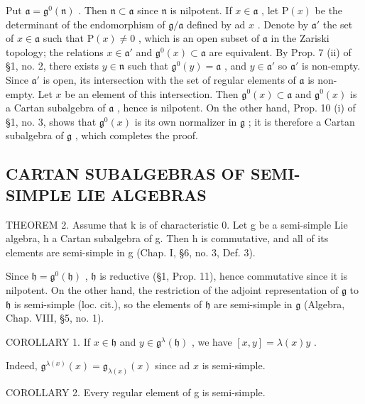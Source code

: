 Put \(\mathfrak{a} = \mathfrak{g}^0 (\mathfrak{n})\) . Then \(\mathfrak{n}\subset \mathfrak{a}\) since \(\mathfrak{n}\) is nilpotent. If \(x\in \mathfrak{a}\) , let \(\mathrm{P}(x)\) be the determinant of the endomorphism of \(\mathfrak{g} / \mathfrak{a}\) defined by ad \(x\) . Denote by \(\mathfrak{a}'\) the set of \(x\in \mathfrak{a}\) such that \(\mathrm{P}(x)\neq 0\) , which is an open subset of \(\mathfrak{a}\) in the Zariski topology; the relations \(x\in \mathfrak{a}'\) and \(\mathfrak{g}^0 (x)\subset \mathfrak{a}\) are equivalent. By Prop. 7 (ii) of §1, no. 2, there exists \(y\in \mathfrak{n}\) such that \(\mathfrak{g}^0 (y) = \mathfrak{a}\) , and \(y\in \mathfrak{a}'\) so \(\mathfrak{a}'\) is non-empty. Since \(\mathfrak{a}'\) is open, its intersection with the set of regular elements of \(\mathfrak{a}\) is non-empty. Let \(x\) be an element of this intersection. Then \(\mathfrak{g}^0 (x)\subset \mathfrak{a}\) and \(\mathfrak{g}^0 (x)\) is a Cartan subalgebra of \(\mathfrak{a}\) , hence is nilpotent. On the other hand, Prop. 10 (i) of §1, no. 3, shows that \(\mathfrak{g}^0 (x)\) is its own normalizer in \(\mathfrak{g}\) ; it is therefore a Cartan subalgebra of \(\mathfrak{g}\) , which completes the proof.

\subsection{CARTAN SUBALGEBRAS OF SEMI-SIMPLE LIE ALGEBRAS}

THEOREM 2. Assume that k is of characteristic 0. Let g be a semi-simple Lie algebra, h a Cartan subalgebra of g. Then h is commutative, and all of its elements are semi-simple in g (Chap. I, §6, no. 3, Def. 3).

Since \(\mathfrak{h} = \mathfrak{g}^0 (\mathfrak{h})\) , \(\mathfrak{h}\) is reductive (§1, Prop. 11), hence commutative since it is nilpotent. On the other hand, the restriction of the adjoint representation of \(\mathfrak{g}\) to \(\mathfrak{h}\) is semi-simple (loc. cit.), so the elements of \(\mathfrak{h}\) are semi-simple in \(\mathfrak{g}\) (Algebra, Chap. VIII, §5, no. 1).

COROLLARY 1. If \(x \in \mathfrak{h}\) and \(y \in \mathfrak{g}^{\lambda}(\mathfrak{h})\) , we have \([x, y] = \lambda(x)y\) .

Indeed, \(\mathfrak{g}^{\lambda (x)}(x) = \mathfrak{g}_{\lambda (x)}(x)\) since ad \(x\) is semi-simple.

COROLLARY 2. Every regular element of g is semi-simple.

